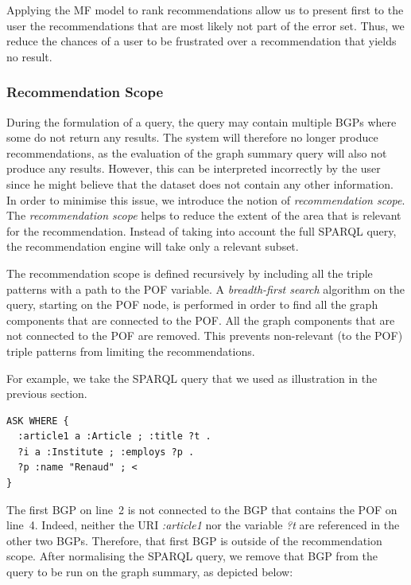 Applying the \gls{MF} model to rank recommendations allow us to present first to the user the recommendations that are most likely not part of the error set. Thus, we reduce the chances of a user to be frustrated over a recommendation that yields no result.

\subsubsection{Recommendation Scope}

During the formulation of a query, the query may contain multiple BGPs where some do not return any results. The system will therefore no longer produce recommendations, as the evaluation of the graph summary query will also not produce any results. However, this can be interpreted incorrectly by the user since he might believe that the dataset does not contain any other information. In order to minimise this issue, we introduce the notion of \emph{recommendation scope}.\\

The \emph{recommendation scope} helps to reduce the extent of the area that is relevant for the recommendation. Instead of taking into account the full SPARQL query, the recommendation engine will take only a relevant subset.

The recommendation scope is defined recursively by including all the triple patterns with a path to the \gls{POF} variable. A \emph{breadth-first search} algorithm on the query, starting on the POF node, is performed in order to find all the graph components that are connected to the POF. All the graph components that are not connected to the \gls{POF} are removed. This prevents non-relevant (to the \gls{POF}) triple patterns from limiting the recommendations.

For example, we take the SPARQL query that we used as illustration in the previous section.

\begin{verbatim}
ASK WHERE {
  :article1 a :Article ; :title ?t .
  ?i a :Institute ; :employs ?p .
  ?p :name "Renaud" ; <
}
\end{verbatim}

The first BGP on line~2 is not connected to the BGP that contains the \gls{POF} on line~4. Indeed, neither the URI \emph{:article1} nor the variable \emph{?t} are referenced in the other two BGPs. Therefore, that first BGP is outside of the recommendation scope. After normalising the SPARQL query, we remove that BGP from the query to be run on the graph summary, as depicted below:

